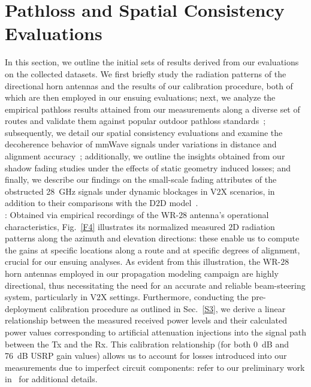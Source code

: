 \documentclass[10pt, twocolumn]{IEEEtran}
\begin{document}
{%
\section{Pathloss and Spatial Consistency Evaluations}\label{S4}
In this section, we outline the initial sets of results derived from our evaluations on the collected datasets. We first briefly study the radiation patterns of the directional horn antennas and the results of our calibration procedure, both of which are then employed in our ensuing evaluations; next, we analyze the empirical pathloss results attained from our measurements along a diverse set of routes and validate them against popular outdoor pathloss standards~\cite{MacCartneyModelsOverview}; subsequently, we detail our spatial consistency evaluations and examine the decoherence behavior of mmWave signals under variations in distance and alignment accuracy~\cite{SpatialConsistencyOriginal}; additionally, we outline the insights obtained from our shadow fading studies under the effects of static geometry induced losses; and finally, we describe our findings on the small-scale fading attributes of the obstructed \SI{28}{\giga\hertz} signals under dynamic blockages in V$2$X scenarios, in addition to their comparisons with the D$2$D model~\cite{D2DHumanBlockage}.\\
: Obtained via empirical recordings of the WR-$28$ antenna's operational characteristics, Fig.~\ref{F4} illustrates its normalized measured $2$D radiation patterns along the azimuth and elevation directions: these enable us to compute the gains at specific locations along a route and at specific degrees of alignment, crucial for our ensuing analyses. As evident from this illustration, the WR-$28$ horn antennas employed in our propagation modeling campaign are highly directional, thus necessitating the need for an accurate and reliable beam-steering system, particularly in V$2$X settings. Furthermore, conducting the pre-deployment calibration procedure as outlined in Sec.~\ref{S3}, we derive a linear relationship between the measured received power levels and their calculated power values corresponding to artificial attenuation injections into the signal path between the Tx and the Rx. This calibration relationship (for both \SI{0}{\deci\bel} and \SI{76}{\deci\bel} USRP gain values) allows us to account for losses introduced into our measurements due to imperfect circuit components: refer to our preliminary work in~\cite{SPAVE_ICC} for additional details.
}
\end{document}
